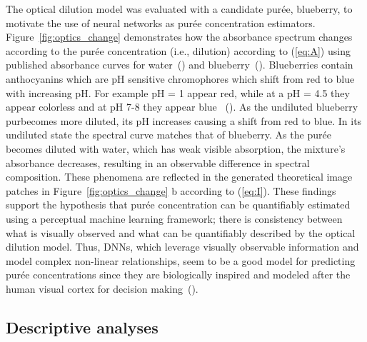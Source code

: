 \documentclass[authoryear]{elsarticle}
\begin{document}
The optical dilution model was evaluated with a candidate pur\' ee, blueberry, to motivate the use of neural networks as pur\' ee concentration estimators. Figure~\ref{fig:optics_change} demonstrates how the absorbance spectrum changes according to the pur\' ee concentration (i.e., dilution) according to (\ref{eq:A}) using published absorbance curves for water~(\cite{robin1997}) and blueberry~(\cite{teoli2016}). Blueberries contain anthocyanins which are pH sensitive chromophores which shift from red to blue with increasing pH. For example pH = 1 appear red, while at a pH = 4.5 they appear colorless and at pH 7-8 they appear blue ~(\cite{wrolstad1993}). As the undiluted blueberry pur\ee becomes more diluted, its pH increases causing a shift from red to blue. In its undiluted state the spectral curve matches that of blueberry. As the pur\' ee becomes diluted with water, which has weak visible absorption, the mixture's absorbance decreases, resulting in an observable difference in spectral composition. These phenomena are reflected in the generated theoretical image patches in Figure~\ref{fig:optics_change} b according to (\ref{eq:I}). These findings support the hypothesis that pur\' ee  concentration can be quantifiably estimated using a perceptual machine learning framework; there is consistency between what is visually observed and what can be quantifiably described by the optical dilution model. Thus, DNNs, which leverage visually observable information and model complex non-linear relationships, seem to be a good model for predicting pur\' ee concentrations since they are biologically inspired and modeled after the human visual cortex for decision making~(\cite{bengio2009}).

\subsection{Descriptive analyses}\label{ssec:descriptives}
\end{document}
